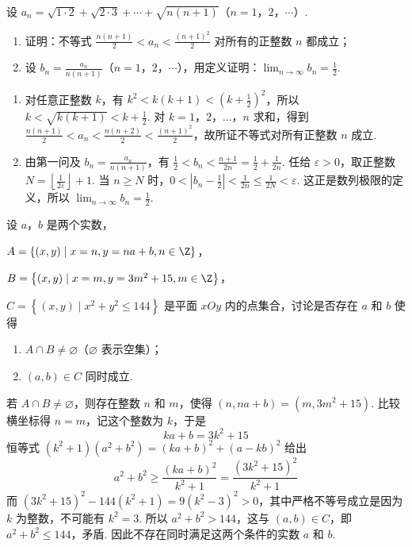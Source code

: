 \begin{problem}

设 \(a_{n}=\sqrt{1\cdot 2}+\sqrt{2\cdot 3}+\cdots+\sqrt{n(n+1)}\)（\(n=1\)，\(2\)，\(\cdots\)）.

\begin{enumerate}
\item 证明：不等式 \(\frac{n(n+1)}{2}<a_n<\frac{(n+1)^2}{2}\) 对所有的正整数 \(n\) 都成立；
\item 设 \(b_n=\frac{a_n}{n(n+1)}\)（\(n=1\)，\(2\)，\(\cdots\)），用定义证明：\(\displaystyle\lim_{n\to\infty}b_n=\frac{1}{2}\).
\end{enumerate}

\begin{solution}
\begin{enumerate}
\item 对任意正整数 \(k\)，有 \(k^2<k(k+1)<\left(k+\frac{1}{2}\right)^2\)，所以 \(k<\sqrt{k(k+1)}<k+\frac{1}{2}\). 对 \(k=1\)，\(2\)，\(\ldots\)，\(n\) 求和，得到 \(\frac{n(n+1)}{2}<a_n<\frac{n(n+2)}{2}<\frac{(n+1)^2}{2}\)，故所证不等式对所有正整数 \(n\) 成立.
\item 由第一问及 \(b_n=\frac{a_n}{n(n+1)}\)，有 \(\frac{1}{2}<b_n<\frac{n+1}{2n}=\frac{1}{2}+\frac{1}{2n}\). 任给 \(\varepsilon>0\)，取正整数 \(N=\left\lfloor\frac{1}{2\varepsilon}\right\rfloor+1\). 当 \(n\geqslant N\) 时，\(0<\left|b_n-\frac{1}{2}\right|<\frac{1}{2n}\leqslant\frac{1}{2N}<\varepsilon\). 这正是数列极限的定义，所以 \(\displaystyle\lim_{n\to\infty}b_n=\frac{1}{2}\).
\end{enumerate}
\end{solution}
\end{problem}

\begin{problem}

设 \(a\)，\(b\) 是两个实数，

\(A = \left\{\left(x, y\right)\mid x = n, y = na + b, n \in \Z\right\}\)，

\(B = \left\{\left(x, y\right)\mid x = m, y = 3m^2 + 15, m \in \Z\right\}\)，

\(C = \left\{(x, y)\mid x^2 + y^2 \leqslant 144\right\}\) 是平面 \(xOy\) 内的点集合，讨论是否存在 \(a\) 和 \(b\) 使得

\begin{enumerate}
\item \(A \cap B \neq \varnothing\)（\(\varnothing\) 表示空集）；
\item \(\left(a,b\right)\in C\) 同时成立.
\end{enumerate}

\begin{solution}
若 \(A\cap B\neq\varnothing\)，则存在整数 \(n\) 和 \(m\)，使得 \((n,na+b)=(m,3m^2+15)\). 比较横坐标得 \(n=m\)，记这个整数为 \(k\)，于是
\[
ka+b=3k^2+15
\]
恒等式 \((k^2+1)(a^2+b^2)=(ka+b)^2+(a-kb)^2\) 给出
\[
a^2+b^2\geqslant\frac{(ka+b)^2}{k^2+1}=\frac{(3k^2+15)^2}{k^2+1}
\]
而 \((3k^2+15)^2-144(k^2+1)=9(k^2-3)^2>0\)，其中严格不等号成立是因为 \(k\) 为整数，不可能有 \(k^2=3\). 所以 \(a^2+b^2>144\)，这与 \((a,b)\in C\)，即 \(a^2+b^2\leqslant144\)，矛盾. 因此不存在同时满足这两个条件的实数 \(a\) 和 \(b\).
\end{solution}
\end{problem}

